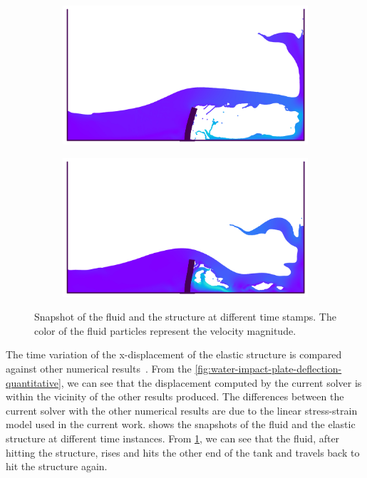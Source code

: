 \begin{figure}[H]
  \begin{subfigure}{0.48\textwidth}
    \centering
        \includegraphics[scale=0.5]{figures/fsi/figures/sun_2019_dam_breaking_flow_impacting_an_elastic_plate/snap_t_3.png}
  \end{subfigure}

  \begin{subfigure}{0.48\textwidth}
    \centering
    \includegraphics[scale=0.5]{figures/fsi/figures/sun_2019_dam_breaking_flow_impacting_an_elastic_plate/snap_t_4.png}
  \end{subfigure}
    \caption
    { Snapshot of the fluid and the structure at different time stamps. The
      color of the fluid particles represent the velocity magnitude. }
    \label{fig:dam-breaking-onto-plate-snapshot}
\end{figure}
The time variation of the x-displacement of the elastic structure is compared
against other numerical results~\parencite{sun2019fully,bogaers2016evaluation}.
From the \cref{fig:water-impact-plate-deflection-quantitative}, we can see that
the displacement computed by the current solver is within the vicinity of the
other results produced. The differences between the current solver with the
other numerical results are due to the linear stress-strain model used in the
current work.  shows the snapshots of
the fluid and the elastic structure at different time instances. From
\cref{fig:dam-breaking-onto-plate-snapshot}, we can see that the fluid, after
hitting the structure, rises and hits the other end of the tank and travels back
to hit the structure again.

